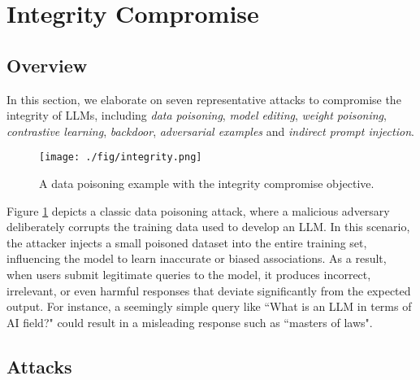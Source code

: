 \section{Integrity Compromise} \label{sec:integrity}

\subsection{Overview}

In this section, we elaborate on seven representative attacks to compromise the integrity of LLMs, including {\em data poisoning}, {\em model editing}, {\em weight poisoning}, {\em contrastive learning}, {\em backdoor}, {\em adversarial examples} and {\em indirect prompt injection}.

\begin{figure}[h]
	\centering
	\texttt{[image: ./fig/integrity.png]}
	\caption{A data poisoning example with the integrity compromise objective.}
	\label{fig:integrity}
\end{figure}

Figure \ref{fig:integrity} depicts a classic data poisoning attack, where a malicious adversary deliberately corrupts the training data used to develop an LLM. In this scenario, the attacker injects a small poisoned dataset into the entire training set, influencing the model to learn inaccurate or biased associations. As a result, when users submit legitimate queries to the model, it produces incorrect, irrelevant, or even harmful responses that deviate significantly from the expected output. For instance, a seemingly simple query like ``What is an LLM in terms of AI field?" could result in a misleading response such as ``masters of laws". 

\subsection{Attacks}

